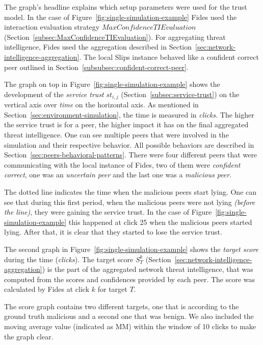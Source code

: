 The graph's headline explains which setup parameters were used for the trust model. In the case of Figure~\ref{fig:single-simulation-example} Fides used the interaction evaluation strategy $MaxConfidenceTIEvaluation$ (Section~\ref{subsec:MaxConfidenceTIEvaluation}).
For aggregating threat intelligence, Fides used the aggregation described in Section~\ref{sec:network-intelligence-aggregation}.
The local Slips instance behaved like a confident correct peer outlined in Section~\ref{subsubsec:confident-correct-peer}.

The graph on top in Figure~\ref{fig:single-simulation-example} shows the development of the \textit{service trust} $st_{i, j}$ (Section~\ref{subsec:service-trust}) on the vertical axis over \textit{time} on the horizontal axis. As mentioned in Section~\ref{sec:environment-simulation}, the time is measured in \textit{clicks}.
The higher the service trust is for a peer, the higher impact it has on the final aggregated threat intelligence.
One can see multiple peers that were involved in the simulation and their respective behavior. All possible behaviors are described in Section~\ref{sec:peers-behavioral-patterns}.
There were four different peers that were communicating with the local instance of Fides, two of them were \textit{confident correct}, one was an \textit{uncertain peer} and the last one was a \textit{malicious peer}.

The dotted line indicates the time when the malicious peers start lying.
One can see that during this first period, when the malicious peers were not lying \textit{(before the line)}, they were gaining the service trust.
In the case of Figure~\ref{fig:single-simulation-example} this happened at click 25 when the malicious peers started lying.
After that, it is clear that they started to lose the service trust.

The second graph in Figure~\ref{fig:single-simulation-example} shows the \textit{target score} during the time (\textit{clicks}).
The target score $S^{k}_{T}$ (Section~\ref{sec:network-intelligence-aggregation}) is the part of the aggregated network threat intelligence, that was computed from the scores and confidences provided by each peer.
The score was calculated by Fides at click $k$ for target $T$.

The score graph contains two different targets, one that is according to the ground truth malicious and a second one that was benign.
We also included the moving average value (indicated as MM) within the window of 10 clicks to make the graph clear.

